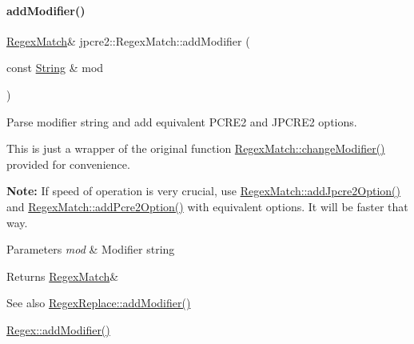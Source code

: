 \paragraph{\texorpdfstring{add\+Modifier()}{addModifier()}}
{\footnotesize\ttfamily \hyperlink{classjpcre2_1_1RegexMatch}{Regex\+Match}\& jpcre2\+::\+Regex\+Match\+::add\+Modifier (\begin{DoxyParamCaption}\item[{const \hyperlink{namespacejpcre2_a91f03070152fb228bc116c5a737f1d16}{String} \&}]{mod }\end{DoxyParamCaption})\hspace{0.3cm}{\ttfamily [inline]}}



Parse modifier string and add equivalent P\+C\+R\+E2 and J\+P\+C\+R\+E2 options. 

This is just a wrapper of the original function \hyperlink{classjpcre2_1_1RegexMatch_a877be3123d789020d259939bc79e8cfe_a877be3123d789020d259939bc79e8cfe}{Regex\+Match\+::change\+Modifier()} provided for convenience.

{\bfseries Note\+:} If speed of operation is very crucial, use \hyperlink{classjpcre2_1_1RegexMatch_a0a4cf8554a7e00f3cf2db34f60a43f60_a0a4cf8554a7e00f3cf2db34f60a43f60}{Regex\+Match\+::add\+Jpcre2\+Option()} and \hyperlink{classjpcre2_1_1RegexMatch_aac4857cd8f5eae15b29b9afbe9023522_aac4857cd8f5eae15b29b9afbe9023522}{Regex\+Match\+::add\+Pcre2\+Option()} with equivalent options. It will be faster that way. 
\begin{DoxyParams}{Parameters}
{\em mod} & Modifier string \\
\hline
\end{DoxyParams}
\begin{DoxyReturn}{Returns}
\hyperlink{classjpcre2_1_1RegexMatch}{Regex\+Match}\& 
\end{DoxyReturn}
\begin{DoxySeeAlso}{See also}
\hyperlink{classjpcre2_1_1RegexReplace_a06a57430f62058822d48722a2a6425d7_a06a57430f62058822d48722a2a6425d7}{Regex\+Replace\+::add\+Modifier()} 

\hyperlink{classjpcre2_1_1Regex_ab1af1471339602446d8221b8c97c6b55_ab1af1471339602446d8221b8c97c6b55}{Regex\+::add\+Modifier()} 
\end{DoxySeeAlso}
\hypertarget{classjpcre2_1_1RegexMatch_aac4857cd8f5eae15b29b9afbe9023522_aac4857cd8f5eae15b29b9afbe9023522}{}\label{classjpcre2_1_1RegexMatch_aac4857cd8f5eae15b29b9afbe9023522_aac4857cd8f5eae15b29b9afbe9023522} 
